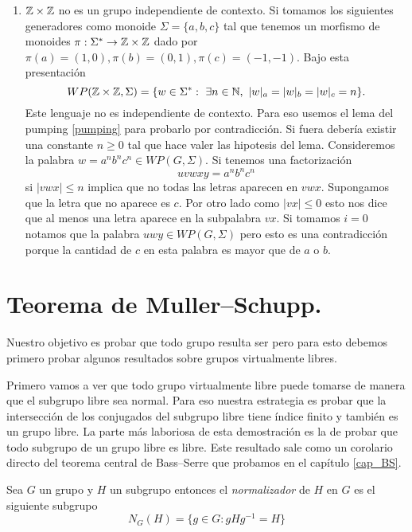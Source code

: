 \documentclass[tesis.tex]{subfiles}
\begin{document}
\begin{ej}
\begin{enumerate}[E1.]
		\item 	$\mathbb{Z} \times \mathbb{Z}$ no es un grupo independiente de contexto.
		Si tomamos los siguientes generadores como monoide $\Sigma = \{ a,b,c \}$ tal que tenemos un morfismo de monoides $\pi: \Sigma^* \to \mathbb{Z} \times \mathbb{Z}$ dado por $\pi(a)=(1,0), \pi(b)=(0,1), \pi(c)=(-1,-1)$.
		Bajo esta presentación 
		\[
		WP(\mathbb{Z} \times \mathbb{Z}, \Sigma) = \{ w \in \Sigma^*  : \ \exists n \in \mathbb{N}, \ |w|_a = |w|_b = |w|_c = n \}.
		\]
		Este lenguaje no es independiente de contexto.
		Para eso usemos el lema del pumping \ref{pumping} para probarlo por contradicción.
		Si fuera \ic debería existir una constante $n \ge 0$ tal que hace valer las hipotesis del lema.
		Consideremos la palabra $w = a^n b^n c^n \in WP(G, \Sigma)$.
		Si tenemos una factorización 
		\[
		uvwxy = a^nb^nc^n
		\]
		si $|vwx| \le n$ implica que no todas las letras aparecen en $vwx$.
		Supongamos que la letra que no aparece es $c$.
		Por otro lado como $|vx| \le 0$ esto nos dice que al menos una letra aparece en la subpalabra $vx$.
		Si tomamos $i=0$ notamos que la palabra $uwy \in WP(G,\Sigma)$ pero esto es una contradicción porque la cantidad de $c$ en esta palabra es mayor que de $a$ o $b$.
	\end{enumerate}
\end{ej}





\section{Teorema de Muller--Schupp.}\label{secc_teo_MS}

Nuestro objetivo es probar que todo grupo \vl resulta ser \ic pero para esto debemos primero probar algunos resultados sobre grupos virtualmente libres.

Primero vamos a ver que todo grupo virtualmente libre puede tomarse de manera que el subgrupo libre sea normal.
Para eso nuestra estrategia es probar que la intersección de los conjugados del subgrupo libre tiene índice finito y también es un grupo libre. 
La parte más laboriosa de esta demostración es la de probar que todo subgrupo de un grupo libre es libre.
Este resultado sale como un corolario directo del teorema central de Bass--Serre que probamos en el capítulo \ref{cap_BS}.
\begin{deff}
	Sea $G$ un grupo y $H$ un subgrupo entonces el \emph{normalizador} de $H$ en $G$ es el siguiente subgrupo
	\begin{equation*}
		N_G(H) = \{ g\in G : gHg^{-1} = H  \}
	\end{equation*}
\end{deff}
\end{document}
